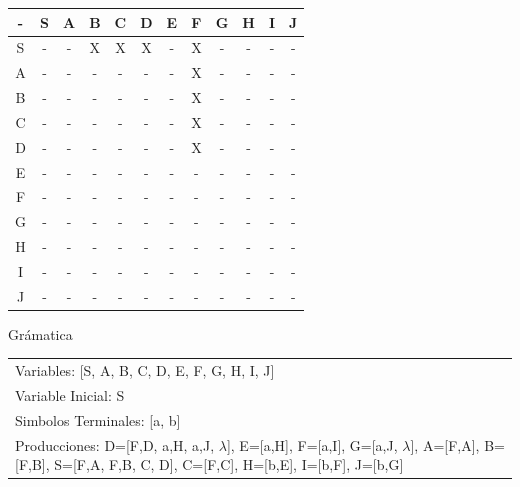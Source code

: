 \documentclass[a4paper,11pt]{article}
\newcommand{\MYp}[1]{ {\color[rgb]{0.392,0.392,0.392}#1} }
\begin{document}
\begin{center}
\begin{tabular}{||c||c||c||c||c||c||c||c||c||c||c||c||}
\hline
\hline
  -  & S & A & B & C & D & E & F & G & H & I & J \\ 
\hline
\hline
 S  &  -  &  -  &  X  &  X  &  X  &  -  &  X  &  -  &  -  &  -  &  -  \\ 
\hline
\hline
 A  &  -  &  -  &  -  &  -  &  -  &  -  &  X  &  -  &  -  &  -  &  -  \\ 
\hline
\hline
 B  &  -  &  -  &  -  &  -  &  -  &  -  &  X  &  -  &  -  &  -  &  -  \\ 
\hline
\hline
 C  &  -  &  -  &  -  &  -  &  -  &  -  &  X  &  -  &  -  &  -  &  -  \\ 
\hline
\hline
 D  &  -  &  -  &  -  &  -  &  -  &  -  &  X  &  -  &  -  &  -  &  -  \\ 
\hline
\hline
 E  &  -  &  -  &  -  &  -  &  -  &  -  &  -  &  -  &  -  &  -  &  -  \\ 
\hline
\hline
 F  &  -  &  -  &  -  &  -  &  -  &  -  &  -  &  -  &  -  &  -  &  -  \\ 
\hline
\hline
 G  &  -  &  -  &  -  &  -  &  -  &  -  &  -  &  -  &  -  &  -  &  -  \\ 
\hline
\hline
 H  &  -  &  -  &  -  &  -  &  -  &  -  &  -  &  -  &  -  &  -  &  -  \\ 
\hline
\hline
 I  &  -  &  -  &  -  &  -  &  -  &  -  &  -  &  -  &  -  &  -  &  -  \\ 
\hline
\hline
 J  &  -  &  -  &  -  &  -  &  -  &  -  &  -  &  -  &  -  &  -  &  -  \\ 
\hline
\hline
\end{tabular}
\end{center}
\MYp{\Huge Gr\'amatica}
\newline
\begin{center}\begin{tabular}{ m{15cm} }


Variables: [S, A, B, C, D, E, F, G, H, I, J] \\
Variable Inicial: S \\
Simbolos Terminales: [a, b] \\
Producciones: {D=[F,D, a,H, a,J, $\lambda$], E=[a,H], F=[a,I], G=[a,J, $\lambda$], A=[F,A], B=[F,B], S=[F,A, F,B, C, D], C=[F,C], H=[b,E], I=[b,F], J=[b,G]} \\

\end{tabular}
\end{center}
\end{document}
